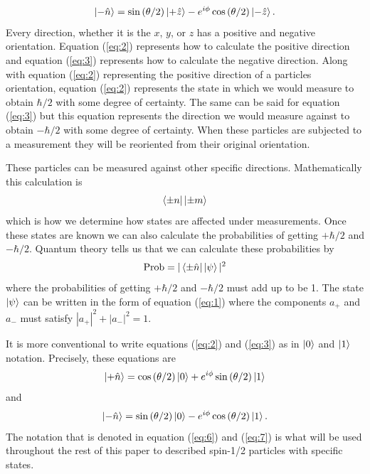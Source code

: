 \documentclass[twocolumn]{article}
\begin{document}
\begin{equation} \label{eq:3}
\ket{-\hat{n}}=\sin{(\theta/2)}\ket{+\hat{z}}-e^{i\phi}\cos{(\theta/2)}\ket{-\hat{z}}.
\end{equation}
Every direction, whether it is the $x$, $y$, or $z$ has a positive and negative orientation. Equation (\ref{eq:2}) represents how to calculate the positive direction and equation (\ref{eq:3}) represents how to calculate the negative direction. Along with equation (\ref{eq:2}) representing the positive direction of a particles orientation, equation (\ref{eq:2}) represents the state in which we would measure to obtain $\hbar/2$ with some degree of certainty. The same can be said for equation (\ref{eq:3}) but this equation represents the direction we would measure against to obtain $-\hbar/2$ with some degree of certainty. When these particles are subjected to a measurement they will be reoriented from their original orientation.

These particles can be measured against other specific directions. Mathematically this calculation is 
\begin{equation} \label{eq:4}
\bra{\pm n}\ket{\pm m}
\end{equation}
which is how we determine how states are affected under measurements. Once these states are known we can also calculate the probabilities of getting $+\hbar/2$ and $-\hbar/2$. Quantum theory tells us that we can calculate these probabilities by
\begin{equation} \label{eq:5}
\text{Prob}=|\bra{\pm\hat{n}}\ket{\psi}|^2
\end{equation}
where the probabilities of getting $+\hbar/2$ and $-\hbar/2$ must add up to be 1. The state $\ket{\psi}$ can be written in the form of equation (\ref{eq:1}) where the components $a_+$ and $a_-$ must satisfy $|a_+|^2+|a_-|^2=1$.

It is more conventional to write equations (\ref{eq:2}) and (\ref{eq:3}) as in $\ket{0}$ and $\ket{1}$ notation. Precisely, these equations are
\begin{equation} \label{eq:6}
\ket{+\hat{n}}=\cos{(\theta/2)}\ket{0}+e^{i\phi}\sin{(\theta/2)}\ket{1}
\end{equation}
and
\begin{equation} \label{eq:7}
\ket{-\hat{n}}=\sin{(\theta/2)}\ket{0}-e^{i\phi}\cos{(\theta/2)}\ket{1}.
\end{equation}
The notation that is denoted in equation (\ref{eq:6}) and (\ref{eq:7}) is what will be used throughout the rest of this paper to described spin-1/2 particles with specific states.
\end{document}
